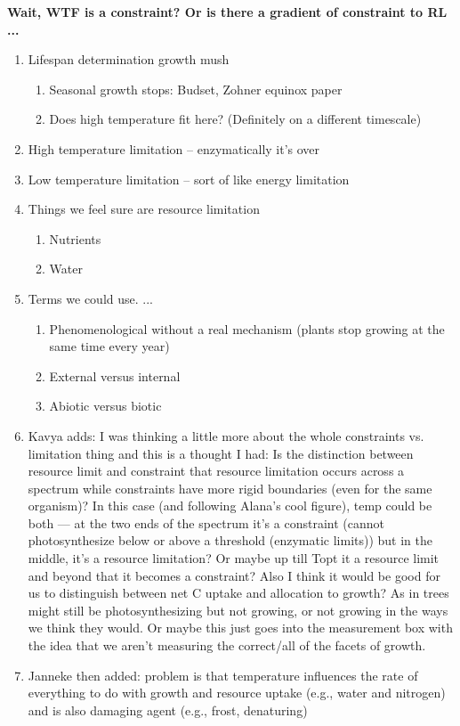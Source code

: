 \documentclass[11pt,letter]{article}
\begin{document}
{\bf Wait, WTF is a constraint? Or is there a gradient of constraint to RL ... }
\begin{enumerate}

\item Lifespan determination growth mush
\begin{enumerate}
\item Seasonal growth stops: Budset, Zohner equinox paper
\item Does high temperature fit here? (Definitely on a different timescale)
\end{enumerate}
\item High temperature limitation -- enzymatically it's over
\item Low temperature limitation -- sort of like energy limitation 
\item Things we feel sure are resource limitation
\begin{enumerate}
\item Nutrients
\item Water
\end{enumerate}
\item Terms we could use. ... 
\begin{enumerate}
\item Phenomenological without a real mechanism (plants stop growing at the same time every year)
\item External versus internal
\item Abiotic versus biotic
\end{enumerate}
\item Kavya adds: I was thinking a little more about the whole constraints vs. limitation thing and this is a thought I had:
Is the distinction between resource limit and constraint that resource limitation occurs across a spectrum while constraints have more rigid boundaries (even for the same organism)? In this case (and following Alana’s cool figure), temp could be both — at the two ends of the spectrum it's a constraint (cannot photosynthesize below or above a threshold (enzymatic limits)) but in the middle, it’s a resource limitation? Or maybe up till Topt it a resource limit and beyond that it becomes a constraint?
Also I think it would be good for us to distinguish between net C uptake and allocation to growth? As in trees might still be photosynthesizing but not growing, or not growing in the ways we think they would. Or maybe this just goes into the measurement box with the idea that we aren't measuring the correct/all of the facets of growth. 
\item Janneke then added: problem is that temperature influences the rate of everything to do with growth and resource uptake (e.g., water and nitrogen) and is also damaging agent (e.g., frost, denaturing)
\end{enumerate}
\end{document}
